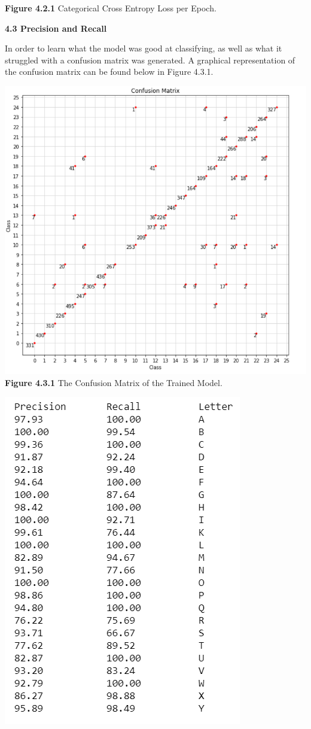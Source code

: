 \documentclass[11pt]{article}
\begin{document}
\begin{multicols}{2}
\begin{center}
\textbf{Figure 4.2.1} Categorical Cross Entropy Loss per Epoch.
\end{center}

\textbf{4.3 Precision and Recall}
\par
In order to learn what the model was good at classifying, as well as what it struggled with a confusion matrix was generated.  A graphical representation of the confusion matrix can be found below in Figure 4.3.1.
\begin{center}
\includegraphics[scale=.50]{ConfusionMatrix}
\textbf{Figure 4.3.1} The Confusion Matrix of the Trained Model.
\end{center}
\begin{center}
\includegraphics[scale=1.0]{PrecisionRecall} 

\end{center}
\end{multicols}
\end{document}
